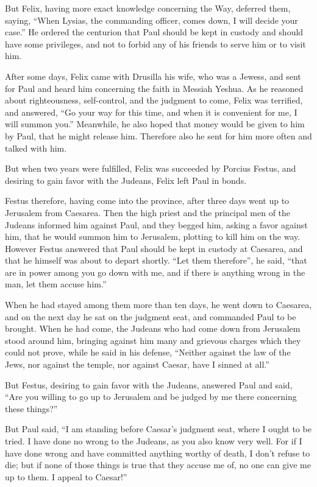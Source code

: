 \myverse{}But Felix, having more exact knowledge concerning the Way, deferred
them, saying, “When Lysias, the commanding officer, comes down, I will decide your case.”
\myverse{}He ordered the centurion that Paul should be kept in custody and should have
some privileges, and not to forbid any of his friends to serve him or to visit him.

\myverse{}After some days, Felix came with Drusilla his wife, who was
a Jewess, and sent for Paul and heard him concerning the faith in Messiah Yeshua.
\myverse{}As he reasoned about righteousness, self-control, and the judgment to come,
Felix was terrified, and answered, “Go your way for this time, and when it is convenient for me, I will
summon you.”
\myverse{}Meanwhile, he also hoped that money would be given to him by Paul, that he
might release him. Therefore also he sent for him more often and talked with him.

\myverse{}But when two years were fulfilled, Felix was succeeded by Porcius
Festus, and desiring to gain favor with the Judeans, Felix left Paul in bonds.


\mychapter{} \myverse*{}Festus therefore, having come into the province, after three days
went up to Jerusalem from Caesarea.
\myverse{}Then the high priest and the principal men of the Judeans informed him against
Paul, and they begged him,
\myverse{}asking a favor against him, that he would summon him to Jerusalem, plotting
to kill him on the way.
\myverse{}However Festus answered that Paul should be kept in custody at Caesarea, and
that he himself was about to depart shortly.
\myverse{}“Let them therefore”, he said, “that are in power among you go down with me,
and if there is anything wrong in the man, let them accuse him.”

\myverse{}When he had stayed among them more than ten days, he went down
to Caesarea, and on the next day he sat on the judgment seat, and commanded Paul to be brought.
\myverse{}When he had come, the Judeans who had come down from Jerusalem stood around
him, bringing against him many and grievous charges which they could not prove,
\myverse{}while he said in his defense, “Neither against the law of the Jews, nor against
the temple, nor against Caesar, have I sinned at all.”

\myverse{}But Festus, desiring to gain favor with the Judeans, answered
Paul and said, “Are you willing to go up to Jerusalem and be judged by me there concerning these things?”

\myverse{}But Paul said, “I am standing before Caesar’s judgment seat,
where I ought to be tried. I have done no wrong to the Judeans, as you also know very well.
\myverse{}For if I have done wrong and have committed anything worthy of death, I don’t
refuse to die; but if none of those things is true that they accuse me of, no one can give me up to them.
I appeal to Caesar!”

